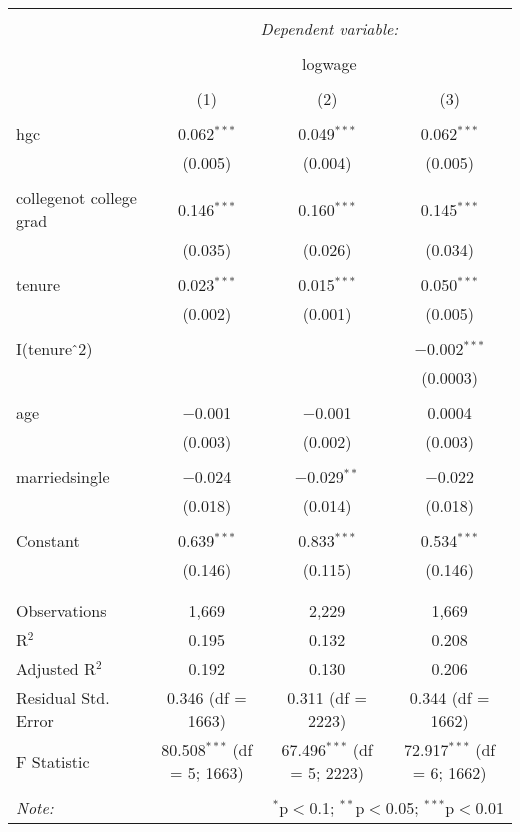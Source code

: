 \documentclass{article}
\begin{document}
\begin{table}[!htbp] \centering 
  \caption{} 
  \label{} 
\begin{tabular}{@{\extracolsep{5pt}}lccc} 
\\[-1.8ex]\hline 
\hline \\[-1.8ex] 
 & \multicolumn{3}{c}{\textit{Dependent variable:}} \\ 
\cline{2-4} 
\\[-1.8ex] & \multicolumn{3}{c}{logwage} \\ 
\\[-1.8ex] & (1) & (2) & (3)\\ 
\hline \\[-1.8ex] 
 hgc & 0.062$^{***}$ & 0.049$^{***}$ & 0.062$^{***}$ \\ 
  & (0.005) & (0.004) & (0.005) \\ 
  & & & \\ 
 collegenot college grad & 0.146$^{***}$ & 0.160$^{***}$ & 0.145$^{***}$ \\ 
  & (0.035) & (0.026) & (0.034) \\ 
  & & & \\ 
 tenure & 0.023$^{***}$ & 0.015$^{***}$ & 0.050$^{***}$ \\ 
  & (0.002) & (0.001) & (0.005) \\ 
  & & & \\ 
 I(tenure$\hat{\mkern6mu}$2) &  &  & $-$0.002$^{***}$ \\ 
  &  &  & (0.0003) \\ 
  & & & \\ 
 age & $-$0.001 & $-$0.001 & 0.0004 \\ 
  & (0.003) & (0.002) & (0.003) \\ 
  & & & \\ 
 marriedsingle & $-$0.024 & $-$0.029$^{**}$ & $-$0.022 \\ 
  & (0.018) & (0.014) & (0.018) \\ 
  & & & \\ 
 Constant & 0.639$^{***}$ & 0.833$^{***}$ & 0.534$^{***}$ \\ 
  & (0.146) & (0.115) & (0.146) \\ 
  & & & \\ 
\hline \\[-1.8ex] 
Observations & 1,669 & 2,229 & 1,669 \\ 
R$^{2}$ & 0.195 & 0.132 & 0.208 \\ 
Adjusted R$^{2}$ & 0.192 & 0.130 & 0.206 \\ 
Residual Std. Error & 0.346 (df = 1663) & 0.311 (df = 2223) & 0.344 (df = 1662) \\ 
F Statistic & 80.508$^{***}$ (df = 5; 1663) & 67.496$^{***}$ (df = 5; 2223) & 72.917$^{***}$ (df = 6; 1662) \\ 
\hline 
\hline \\[-1.8ex] 
\textit{Note:}  & \multicolumn{3}{r}{$^{*}$p$<$0.1; $^{**}$p$<$0.05; $^{***}$p$<$0.01} \\ 
\end{tabular} 
\end{table}  
\end{document}
